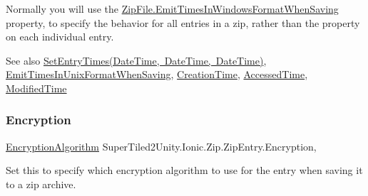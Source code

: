 Normally you will use the \mbox{\hyperlink{class_super_tiled2_unity_1_1_ionic_1_1_zip_1_1_zip_file_a1695d2181d639029b132e67c85734e8c}{Zip\+File.\+Emit\+Times\+In\+Windows\+Format\+When\+Saving}} property, to specify the behavior for all entries in a zip, rather than the property on each individual entry. 

\begin{DoxySeeAlso}{See also}
\mbox{\hyperlink{class_super_tiled2_unity_1_1_ionic_1_1_zip_1_1_zip_entry_a7331ca69b05c476a9d321b30d7649766}{Set\+Entry\+Times(\+Date\+Time, Date\+Time, Date\+Time)}}, \mbox{\hyperlink{class_super_tiled2_unity_1_1_ionic_1_1_zip_1_1_zip_entry_afd50bda347e67681780f32ebdba43f58}{Emit\+Times\+In\+Unix\+Format\+When\+Saving}}, \mbox{\hyperlink{class_super_tiled2_unity_1_1_ionic_1_1_zip_1_1_zip_entry_a38ef2ae810c3b89b1f23ebea918fb60e}{Creation\+Time}}, \mbox{\hyperlink{class_super_tiled2_unity_1_1_ionic_1_1_zip_1_1_zip_entry_abc1a038c251f1ed0e2c1435a5bab23fd}{Accessed\+Time}}, \mbox{\hyperlink{class_super_tiled2_unity_1_1_ionic_1_1_zip_1_1_zip_entry_a88021d72ea8b94c762388d92d74c2e0d}{Modified\+Time}}


\end{DoxySeeAlso}
\mbox{\label{class_super_tiled2_unity_1_1_ionic_1_1_zip_1_1_zip_entry_ab8de4882ffe896d2657b27264807ef1c}} 
\subsubsection{\texorpdfstring{Encryption}{Encryption}}
{\footnotesize\ttfamily \mbox{\hyperlink{namespace_super_tiled2_unity_1_1_ionic_1_1_zip_aa3f4e8aa12ef827ac72177a49b4e28e6}{Encryption\+Algorithm}} Super\+Tiled2\+Unity.\+Ionic.\+Zip.\+Zip\+Entry.\+Encryption\hspace{0.3cm}{\ttfamily [get]}, {\ttfamily [set]}}



Set this to specify which encryption algorithm to use for the entry when saving it to a zip archive. 


